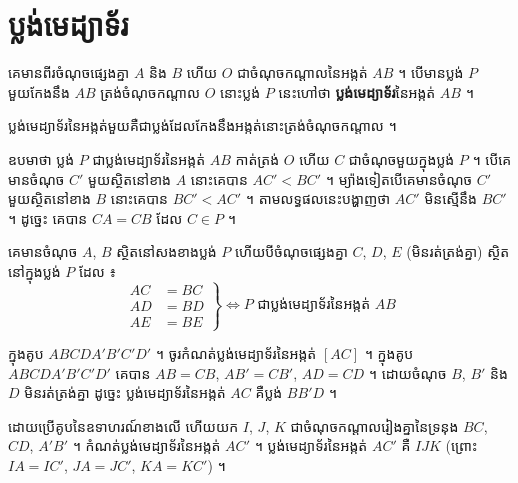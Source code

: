 \section{ប្លង់មេដ្យាទ័រ}
គេមានពីរចំណុចផ្សេងគ្នា $A$ និង $B$ ហើយ $O$ ជាចំណុចកណ្ដាលនៃអង្កត់ $AB$ ។ បើមានប្លង់ $P$ មួយកែងនឹង $AB$ ត្រង់ចំណុចកណ្ដាល $O$ នោះប្លង់ $P$ នេះហៅថា \textbf{ប្លង់មេដ្យាទ័រ}នៃអង្កត់ $AB$ ។
\begin{definition}[និយមន័យ]
ប្លង់មេដ្យាទ័រនៃអង្កត់មួយគឺជាប្លង់ដែលកែងនឹងអង្កត់នោះត្រង់ចំណុចកណ្ដាល ។
\end{definition}
ឧបមាថា ប្លង់ $P$ ជាប្លង់មេដ្យាទ័រនៃអង្កត់ $AB$ កាត់ត្រង់ $O$ ហើយ $C$ ជាចំណុចមួយក្នុងប្លង់ $P$ ។ បើគេមានចំណុច $C'$ មួយស្ថិតនៅខាង $A$ នោះគេបាន $AC' < BC'$ ។ ម្យ៉ាងទៀតបើគេមានចំណុច $C'$ មួយស្ថិតនៅខាង $B$ នោះគេបាន $BC' < AC'$ ។ តាមលទ្ធផលនេះបង្ហាញថា $AC'$ មិនស្មើនឹង $BC'$ ។ ដូច្នេះ គេបាន $CA = CB$ ដែល $C \in P$ ។
\begin{theorem}[លក្ខណៈ]
គេមានចំណុច $A$, $B$ ស្ថិតនៅសងខាងប្លង់ $P$ ហើយបីចំណុចផ្សេងគ្នា $C$, $D$, $E$ (មិនរត់ត្រង់គ្នា) ស្ថិតនៅក្នុងប្លង់ $P$ ដែល ៖
\[
\left.\begin{aligned} AC &= BC\\ AD &= BD\\ AE &= BE \end{aligned}\right\} \Leftrightarrow P \text{ ជាប្លង់មេដ្យាទ័រនៃអង្កត់ } AB
\]
\end{theorem}

\begin{example}[លំហាត់គំរូ]
ក្នុងគូប $ABCDA'B'C'D'$ ។ ចូរកំណត់ប្លង់មេដ្យាទ័រនៃអង្កត់ $[AC]$ ។
\ans
ក្នុងគូប $ABCDA'B'C'D'$ គេបាន $AB = CB$, $AB' = CB'$, $AD = CD$ ។ ដោយចំណុច $B$, $B'$ និង $D$ មិនរត់ត្រង់គ្នា ដូច្នេះ ប្លង់មេដ្យាទ័រនៃអង្កត់ $AC$ គឺប្លង់ $BB'D$ ។
\end{example}

\begin{pro}
ដោយប្រើគូបនៃឧទាហរណ៍ខាងលើ ហើយយក $I$, $J$, $K$ ជាចំណុចកណ្ដាលរៀងគ្នានៃទ្រនុង $BC$, $CD$, $A'B'$ ។ កំណត់ប្លង់មេដ្យាទ័រនៃអង្កត់ $AC'$ ។
\ans
ប្លង់មេដ្យាទ័រនៃអង្កត់ $AC'$ គឺ $IJK$ (ព្រោះ $IA = IC'$, $JA = JC'$, $KA = KC'$) ។
\end{pro}

